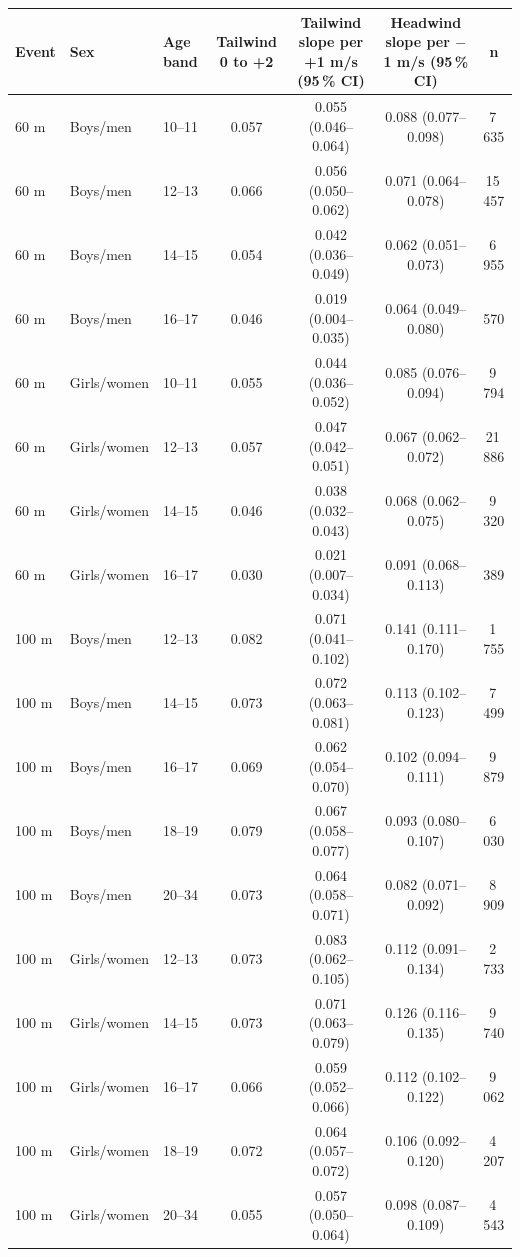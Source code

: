 \begin{tabular}{lllcccc}
\toprule
Event & Sex & Age band & Tailwind 0 to +2 & Tailwind slope per +1 m/s (95\,\% CI) & Headwind slope per $-$1 m/s (95\,\% CI) & n \\
\midrule
60 m & Boys/men & 10--11 & 0.057 & 0.055 (0.046--0.064) & 0.088 (0.077--0.098) & 7\,635 \\
60 m & Boys/men & 12--13 & 0.066 & 0.056 (0.050--0.062) & 0.071 (0.064--0.078) & 15\,457 \\
60 m & Boys/men & 14--15 & 0.054 & 0.042 (0.036--0.049) & 0.062 (0.051--0.073) & 6\,955 \\
60 m & Boys/men & 16--17 & 0.046 & 0.019 (0.004--0.035) & 0.064 (0.049--0.080) & 570 \\
60 m & Girls/women & 10--11 & 0.055 & 0.044 (0.036--0.052) & 0.085 (0.076--0.094) & 9\,794 \\
60 m & Girls/women & 12--13 & 0.057 & 0.047 (0.042--0.051) & 0.067 (0.062--0.072) & 21\,886 \\
60 m & Girls/women & 14--15 & 0.046 & 0.038 (0.032--0.043) & 0.068 (0.062--0.075) & 9\,320 \\
60 m & Girls/women & 16--17 & 0.030 & 0.021 (0.007--0.034) & 0.091 (0.068--0.113) & 389 \\
100 m & Boys/men & 12--13 & 0.082 & 0.071 (0.041--0.102) & 0.141 (0.111--0.170) & 1\,755 \\
100 m & Boys/men & 14--15 & 0.073 & 0.072 (0.063--0.081) & 0.113 (0.102--0.123) & 7\,499 \\
100 m & Boys/men & 16--17 & 0.069 & 0.062 (0.054--0.070) & 0.102 (0.094--0.111) & 9\,879 \\
100 m & Boys/men & 18--19 & 0.079 & 0.067 (0.058--0.077) & 0.093 (0.080--0.107) & 6\,030 \\
100 m & Boys/men & 20--34 & 0.073 & 0.064 (0.058--0.071) & 0.082 (0.071--0.092) & 8\,909 \\
100 m & Girls/women & 12--13 & 0.073 & 0.083 (0.062--0.105) & 0.112 (0.091--0.134) & 2\,733 \\
100 m & Girls/women & 14--15 & 0.073 & 0.071 (0.063--0.079) & 0.126 (0.116--0.135) & 9\,740 \\
100 m & Girls/women & 16--17 & 0.066 & 0.059 (0.052--0.066) & 0.112 (0.102--0.122) & 9\,062 \\
100 m & Girls/women & 18--19 & 0.072 & 0.064 (0.057--0.072) & 0.106 (0.092--0.120) & 4\,207 \\
100 m & Girls/women & 20--34 & 0.055 & 0.057 (0.050--0.064) & 0.098 (0.087--0.109) & 4\,543 \\

\end{tabular}
